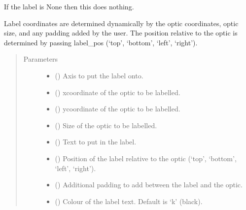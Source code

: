 \documentclass[letterpaper,10pt,english]{sphinxmanual}
\begin{document}
\begin{fulllineitems}
\begin{fulllineitems}
\sphinxAtStartPar
If the label is None then this does nothing.

\sphinxAtStartPar
Label coordinates are determined dynamically by the optic coordinates,
optic size, and any padding added by the user. The position relative
to the optic is determined by passing label\_pos (‘top’, ‘bottom’, ‘left’, ‘right’).
\begin{quote}\begin{description}
\item[{Parameters}] \leavevmode\begin{itemize}
\item {} 
\sphinxAtStartPar
{} () \textendash{} Axis to put the label onto.

\item {} 
\sphinxAtStartPar
{} () \textendash{} x\sphinxhyphen{}coordinate of the optic to be labelled.

\item {} 
\sphinxAtStartPar
{} () \textendash{} y\sphinxhyphen{}coordinate of the optic to be labelled.

\item {} 
\sphinxAtStartPar
{} () \textendash{} Size of the optic to be labelled.

\item {} 
\sphinxAtStartPar
{} () \textendash{} Text to put in the label.

\item {} 
\sphinxAtStartPar
{} () \textendash{} Position of the label relative to the optic (‘top’, ‘bottom’, ‘left’, ‘right’).

\item {} 
\sphinxAtStartPar
{} () \textendash{} Additional padding to add between the label and the optic.

\item {} 
\sphinxAtStartPar
{} (\sphinxstyleliteralemphasis{\sphinxupquote{, }}) \textendash{} Colour of the label text. Default is ‘k’ (black).


\end{itemize}
\end{description}
\end{quote}
\end{fulllineitems}
\end{fulllineitems}
\end{document}
